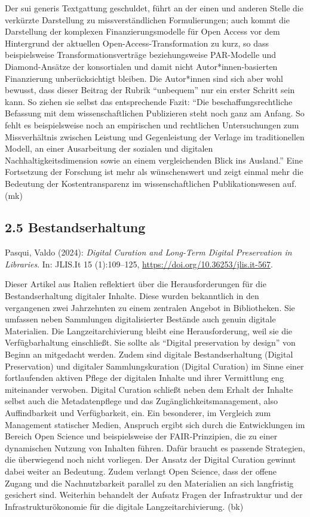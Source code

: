 \documentclass[a4paper,
fontsize=11pt,
oneside,
numbers=noperiodatend,
parskip=half-,
bibliography=totoc,
final
]{scrartcl}
\begin{document}
Der sui generis Textgattung geschuldet, führt an der einen und anderen
Stelle die verkürzte Darstellung zu missverständlichen Formulierungen;
auch kommt die Darstellung der komplexen Finanzierungsmodelle für Open
Access vor dem Hintergrund der aktuellen Open-Access-Transformation zu
kurz, so dass beispielsweise Transformationsverträge beziehungsweise
PAR-Modelle und Diamond-Ansätze der konsortialen und damit nicht
Autor*innen-basierten Finanzierung unberücksichtigt bleiben. Die
Autor*innen sind sich aber wohl bewusst, dass dieser Beitrag der Rubrik
\enquote{unbequem} nur ein erster Schritt sein kann. So ziehen sie
selbst das entsprechende Fazit: \enquote{Die beschaffungsrechtliche
Befassung mit dem wissenschaftlichen Publizieren steht noch ganz am
Anfang. So fehlt es beispielsweise noch an empirischen und rechtlichen
Untersuchungen zum Missverhältnis zwischen Leistung und Gegenleistung
der Verlage im traditionellen Modell, an einer Ausarbeitung der sozialen
und digitalen Nachhaltigkeitsdimension sowie an einem vergleichenden
Blick ins Ausland.} Eine Fortsetzung der Forschung ist mehr als
wünschenswert und zeigt einmal mehr die Bedeutung der Kostentransparenz
im wissenschaftlichen Publikationswesen auf. (mk)

\hypertarget{bestandserhaltung}{%
\subsection{2.5 Bestandserhaltung}\label{bestandserhaltung}}

Pasqui, Valdo (2024): \emph{Digital Curation and Long-Term Digital
Preservation in Libraries}. In: JLIS.It 15 (1):109--125,
\url{https://doi.org/10.36253/jlis.it-567}.

Dieser Artikel aus Italien reflektiert über die Herausforderungen für
die Bestandserhaltung digitaler Inhalte. Diese wurden bekanntlich in den
vergangenen zwei Jahrzehnten zu einem zentralen Angebot in Bibliotheken.
Sie umfassen neben Sammlungen digitalisierter Bestände auch genuin
digitale Materialien. Die Langzeitarchivierung bleibt eine
Herausforderung, weil sie die Verfügbarhaltung einschließt. Sie sollte
als \enquote{Digital preservation by design} von Beginn an mitgedacht
werden. Zudem sind digitale Bestandserhaltung (Digital Preservation) und
digitaler Sammlungskuration (Digital Curation) im Sinne einer
fortlaufenden aktiven Pflege der digitalen Inhalte und ihrer Vermittlung
eng miteinander verwoben. Digital Curation schließt neben dem Erhalt der
Inhalte selbst auch die Metadatenpflege und das
Zugänglichkeitsmanagement, also Auffindbarkeit und Verfügbarkeit, ein.
Ein besonderer, im Vergleich zum Management statischer Medien, Anspruch
ergibt sich durch die Entwicklungen im Bereich Open Science und
beispielsweise der FAIR-Prinzipien, die zu einer dynamischen Nutzung von
Inhalten führen. Dafür braucht es passende Strategien, die überwiegend
noch nicht vorliegen. Der Ansatz der Digital Curation gewinnt dabei
weiter an Bedeutung. Zudem verlangt Open Science, dass der offene Zugang
und die Nachnutzbarkeit parallel zu den Materialien an sich langfristig
gesichert sind. Weiterhin behandelt der Aufsatz Fragen der Infrastruktur
und der Infrastrukturökonomie für die digitale Langzeitarchivierung.
(bk)
\end{document}
